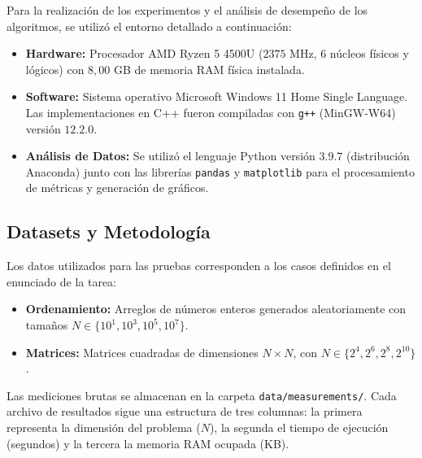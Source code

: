 Para la realización de los experimentos y el análisis de desempeño de los algoritmos, se utilizó el entorno detallado a continuación:

\begin{itemize}
    \item \textbf{Hardware:} Procesador AMD Ryzen 5 4500U ($2375$ MHz, 6 núcleos físicos y lógicos) con $8,00$ GB de memoria RAM física instalada.
    \item \textbf{Software:} Sistema operativo Microsoft Windows 11 Home Single Language. Las implementaciones en C++ fueron compiladas con \texttt{g++} (MinGW-W64) versión $12.2.0$.
    \item \textbf{Análisis de Datos:} Se utilizó el lenguaje Python versión $3.9.7$ (distribución Anaconda) junto con las librerías \texttt{pandas} y \texttt{matplotlib} para el procesamiento de métricas y generación de gráficos.
\end{itemize}

\subsection{Datasets y Metodología}
Los datos utilizados para las pruebas corresponden a los casos definidos en el enunciado de la tarea:

\begin{itemize}
    \item \textbf{Ordenamiento:} Arreglos de números enteros generados aleatoriamente con tamaños $N \in \{10^1, 10^3, 10^5, 10^7\}$.
    \item \textbf{Matrices:} Matrices cuadradas de dimensiones $N \times N$, con $N \in \{2^4, 2^6, 2^8, 2^{10}\}$.
\end{itemize}

Las mediciones brutas se almacenan en la carpeta \texttt{data/measurements/}. Cada archivo de resultados sigue una estructura de tres columnas: la primera representa la dimensión del problema ($N$), la segunda el tiempo de ejecución (segundos) y la tercera la memoria RAM ocupada (KB).